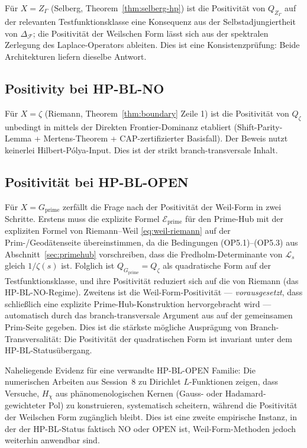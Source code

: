 \documentclass[11pt]{article}
\theoremstyle{definition}
\theoremstyle{remark}
\newcommand{\HBL}{\mathrm{HP\text{-}BL}}
\begin{document}
Für $X = Z_\Gamma$ (Selberg, Theorem~\ref{thm:selberg-hp}) ist die
Positivität von $Q_{Z_\Gamma}$ auf der relevanten Testfunktionsklasse eine
Konsequenz aus der Selbstadjungiertheit von $\Delta_\mathcal{F}$; die Positivität
der Weilschen Form lässt sich aus der spektralen Zerlegung
des Laplace-Operators ableiten. Dies ist eine Konsistenzprüfung: Beide Architekturen
liefern dieselbe Antwort.

\subsection{Positivity bei HP-BL-NO}

Für $X = \zeta$ (Riemann, Theorem~\ref{thm:boundary} Zeile 1) ist die
Positivität von $Q_\zeta$ unbedingt in \cite{Geiger2026RHII}
mittels der Direkten Frontier-Dominanz etabliert (Shift-Parity-Lemma +
Mertens-Theorem + CAP-zertifizierter Basisfall). Der Beweis nutzt keinerlei
Hilbert-P\'olya-Input. Dies ist der strikt branch-transversale Inhalt.

\subsection{Positivität bei HP-BL-OPEN}

Für $X = G_\mathrm{prime}$ zerfällt die Frage nach der Positivität der Weil-Form
in zwei Schritte. Erstens muss die explizite Formel $\mathcal{E}_\mathrm{prime}$
für den Prime-Hub mit der expliziten Formel von Riemann--Weil
\eqref{eq:weil-riemann} auf der Prim-/Geodätenseite übereinstimmen, da
die Bedingungen (OP5.1)--(OP5.3) aus Abschnitt~\ref{sec:primehub}
vorschreiben, dass die Fredholm-Determinante von $\mathcal{L}_s$ gleich $1/\zeta(s)$ ist.
Folglich ist $Q_{G_\mathrm{prime}} = Q_\zeta$ als quadratische Form auf der
Testfunktionsklasse, und ihre Positivität reduziert sich auf die von Riemann
(das HP-BL-NO-Regime). Zweitens ist die Weil-Form-Positivität --- \emph{vorausgesetzt}, dass schließlich eine explizite
Prime-Hub-Konstruktion hervorgebracht wird ---
automatisch durch das branch-transversale Argument aus
\cite{Geiger2026RHII} auf der gemeinsamen Prim-Seite gegeben. Dies ist die stärkste
mögliche Ausprägung von Branch-Transversalität: Die Positivität der
quadratischen Form ist invariant unter dem $\HBL$-Statusübergang.

Naheliegende Evidenz für eine verwandte HP-BL-OPEN Familie: Die numerischen
Arbeiten aus Session~8 zu Dirichlet $L$-Funktionen
\cite{PaleyWienerDirichlet} zeigen, dass Versuche, $H_\chi$ aus phänomenologischen Kernen
(Gauss- oder Hadamard-gewichteter Pol) zu konstruieren,
systematisch scheitern, während die Positivität der Weilschen Form
zugänglich bleibt. Dies ist eine zweite empirische Instanz, in der
der HP-BL-Status faktisch $\mathrm{NO}$ oder $\mathrm{OPEN}$ ist, Weil-Form-Methoden
jedoch weiterhin anwendbar sind.
\end{document}
